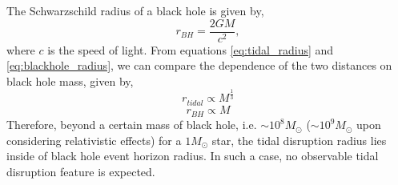 \documentclass{tda}
\begin{document}
\noindent The Schwarzschild radius of a black hole is given by,
\begin{equation}
	r^{}_{BH} = \frac{2GM}{c^2},
	\label{eq:blackhole_radius}
\end{equation}
where \(c\) is the speed of light. From equations \ref{eq:tidal_radius} and \ref{eq:blackhole_radius}, we can compare the dependence of the two distances on black hole mass, given by,
\begin{equation}
	r^{}_{tidal} \propto M^\frac{1}{3}
	\label{eq:tidal_radius_proportionality}
\end{equation}
\begin{equation}
	r^{}_{BH} \propto M
	\label{eq:blackhole_radius_proportionality}
\end{equation}
Therefore, beyond a certain mass of black hole, i.e. \(\sim10^8 M_{\odot}\) (\(\sim10^9 M_{\odot}\) upon considering relativistic effects) for a \(1 M_{\odot}\) star, the tidal disruption radius lies inside of black hole event horizon radius. In such a case, no observable tidal disruption feature is expected.
\end{document}

